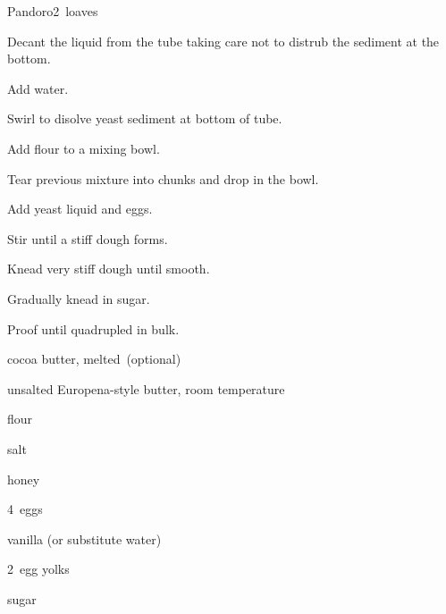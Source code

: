 \begin{recipe}{Pandoro}{}{2~loaves}
\begin{directions}
\item Decant the liquid from the tube taking care not to distrub the sediment at the bottom.
\item Add water.
\item Swirl to disolve yeast sediment at bottom of tube.
\item Add flour to a mixing bowl.
\item Tear previous mixture into chunks and drop in the bowl.
\item Add yeast liquid and eggs.
\item Stir until a stiff dough forms.
\item Knead very stiff dough until smooth.
\item Gradually knead in sugar.
\item Proof until quadrupled in bulk.
\end{directions}

\begin{ingredients}
\item {} cocoa butter, melted~(optional)
\item {} unsalted Europena-style butter, room temperature
\item {} flour
\item {} salt
\item {} honey
\item 4~eggs
\item {} vanilla (or substitute water)
\item 2~egg yolks
\item {} sugar
\end{ingredients}


\end{recipe}
